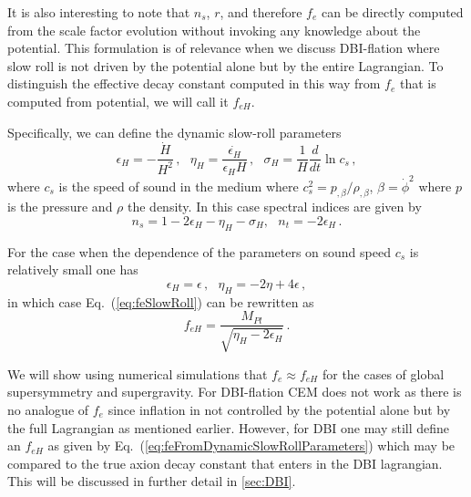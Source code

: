 \documentclass[12pt]{article}
\begin{document}
It is also interesting to note that $n_s$, $r$, and therefore $f_e$ can be directly computed from the scale factor evolution without invoking any knowledge about the potential.
This formulation is of relevance when we discuss DBI-flation where slow roll is not driven by the potential alone but by the entire Lagrangian.
To distinguish the effective decay constant computed in this way from $f_e$ that is computed from potential, we will call it $f_{eH}$.

Specifically, we can define the dynamic slow-roll parameters
\begin{equation} \label{eq:slowRollParametersDynamic}
  \epsilon_H = -\frac{\dot H}{H^2}\,,
  ~~~ \eta_H = \frac{\dot{\epsilon_H}}{\epsilon_H H}\,,
  ~~~ \sigma_H = \frac{1}{H} \frac{d}{dt} \ln c_s\,,
\end{equation}
where $c_s$ is the speed of sound in the medium where $c_s^2 = p_{,\beta} / \rho_{,\beta}$, $\beta = \dot\phi^2$ where $p$ is the pressure and $\rho$ the density.
In this case spectral indices are given by~\cite{Garriga:1999vw, Spalinski:2007qy}
\begin{equation}
      n_s = 1 - 2 \epsilon_H - \eta_H - \sigma_H,
  ~~~ n_t = - 2\epsilon_H\,.
\end{equation}

For the case when the dependence of the parameters on sound speed $c_s$ is relatively small one has
\begin{equation} \label{eq:slowRollParametersDynamicFromStatic}
  \epsilon_H = \epsilon\,,
  ~~~ \eta_H = -2 \eta + 4 \epsilon\,,
\end{equation}
in which case Eq.~(\ref{eq:feSlowRoll}) can be rewritten as
\begin{equation} \label{eq:feFromDynamicSlowRollParameters}
  f_{eH} = \frac{M_{Pl}}{\sqrt{\eta_H - 2 \epsilon_H}}\,.
\end{equation}

We will show using numerical simulations that $f_e \approx f_{eH}$ for the cases of global supersymmetry and supergravity.
For DBI-flation CEM does not work as there is no analogue of $f_e$ since inflation in not controlled by the potential alone but by the full Lagrangian as mentioned earlier.
However, for DBI one may still define an $f_{eH}$ as given by Eq.~(\ref{eq:feFromDynamicSlowRollParameters}) which may be compared to the true axion decay constant that enters in the DBI lagrangian.
This will be discussed in further detail in \ref{sec:DBI}.
\end{document}

